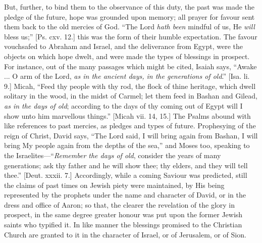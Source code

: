 But, further, to bind them to the observance of this duty, the past
was made the pledge of the future, hope was grounded upon memory; all
prayer for favour sent them back to the old mercies of God. ``The
Lord \emph{hath been} mindful of us, He \emph{will} bless us;''
[Ps. cxv. 12.] this was the form of their humble expectation. The
favour vouchsafed to Abraham and Israel, and the deliverance from
Egypt, were the objects on which hope dwelt, and were made the types
of blessings in prospect. For instance, out of the many passages which
might be cited, Isaiah says, ``Awake ... O arm of the Lord, \emph{as
in the ancient days, in the generations of old}.'' [Isa. li.
9.] Micah, ``Feed thy people with thy rod, the flock of thine
heritage, which dwell solitary in the wood, in the midst of Carmel;
let them feed in Bashan and Gilead, \emph{as in the days of old};
according to the days of thy coming out of Egypt will I show unto him
marvellous things.'' [Micah vii. 14, 15.] The Psalms abound with
like references to past mercies, as pledges and types of future.
Prophesying of the reign of Christ, David says, ``The Lord said, I
will bring again from Bashan, I will bring My people again from the
depths of the sea,'' and Moses too, speaking to the Israelites—``\emph{Remember
the days of old}, consider the years of many generations; ask thy
father and he will show thee; thy elders, and they will tell
thee.'' [Deut. xxxii. 7.] Accordingly, while a coming Saviour was
predicted, still the claims of past times on Jewish piety were
maintained, by His being represented by the prophets under the name
and character of David, or in the dress and office of Aaron; so that,
the clearer the revelation of the glory in prospect, in the same
degree greater honour was put upon the former Jewish saints who
typified it. In like manner the blessings promised to the Christian
Church are granted to it in the character of Israel, or of Jerusalem,
or of Sion.

